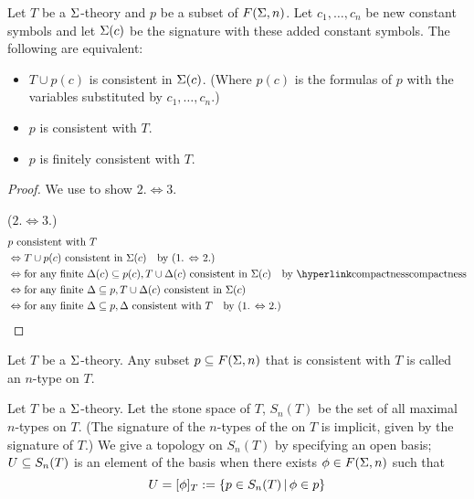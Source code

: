 \begin{lem}
    Let $T$ be a $\Sigma$-theory and $p$ be a subset of $F(\Sigma,n)$.
    Let $c_1,\dots,c_n$ be new constant symbols and let $\Sigma(c)$ be 
    the signature with these added constant symbols.
    The following are equivalent:
    \begin{itemize}
        \item $T \cup p(c)$ is consistent in $\Sigma(c)$.
            (Where $p(c)$ is the formulas of $p$ with the variables substituted 
            by $c_1,\dots,c_n$.)
        \item $p$ is consistent with $T$.
        \item $p$ is finitely consistent with $T$.
    \end{itemize}
\end{lem}
\begin{proof}
    We use  
    to show $2. \iff 3.$

    ($2. \iff 3.$) \begin{align*}
        &p \text{ consistent with } T \\
        &\iff T \cup p(c) \text{ consistent in } \Si(c) 
        \quad \text{by (1. $\iff$ 2.)}\\
        &\iff \text{for any finite } \De(c) \subs p(c), 
        T \cup \De(c) \text{ consistent in } \Si(c) 
        \quad \text{by \linkto{compactness}{compactness}}\\
        &\iff \text{for any finite } \De \subs p, 
        T \cup \De(c) \text{ consistent in } \Si(c) \\
        &\iff \text{for any finite } \De \subs p, 
        \De \text{ consistent with } T
        \quad \text{by (1. $\iff$ 2.)}
    \end{align*}
\end{proof}

\begin{dfn}
    Let $T$ be a $\Sigma$-theory.
    Any subset $p \subseteq F(\Sigma,n)$ that is consistent with $T$
    is called an $n$-type on $T$.
\end{dfn}

\begin{dfn}
    Let $T$ be a $\Sigma$-theory.
    Let the stone space of $T$, 
    $S_n(T)$ be the set of all maximal $n$-types on $T$.
    (The signature of the $n$-types of the on $T$ is implicit, 
    given by the signature of $T$.)
    We give a topology on $S_n(T)$ by specifying an open basis;
    $U \subseteq S_n(T)$ is an element of the basis when there exists 
    $\phi \in F(\Sigma,n)$ such that 
    \[U = [\phi]_T := \left\{p \in S_n(T) \,|\, \phi \in p\right\}\]
\end{dfn}

